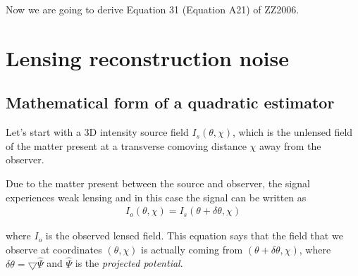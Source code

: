 \documentclass[12pt]{article}
\newcommand{\beqa}{\begin{eqnarray}}
\newcommand{\eeqa}{\end{eqnarray}}
\numberwithin{equation}{section}
\begin{document}
Now we are going to derive Equation 31 (Equation A21) of ZZ2006.

\section{Lensing reconstruction noise}
\subsection{Mathematical form of a quadratic estimator}
Let's start with a 3D intensity source field $I_s(\theta, \chi)$, which is the unlensed field of the matter present at a transverse comoving distance $\chi$ away from the observer. 

Due to the matter present between the source and observer, the signal experiences weak lensing and in this case the signal can be written as
\beqa
I_o(\theta,\chi) = I_s(\theta + \delta\theta, \chi )
\eeqa

where $I_o$ is the observed lensed field. This equation says that the field that we observe at coordinates $(\theta,\chi)$ is actually coming from $(\theta + \delta\theta, \chi)$, where $\delta\theta = \bigtriangledown\hat{\Psi}$ and $\hat{\Psi}$ is the \textit{projected potential}. 
\end{document}

